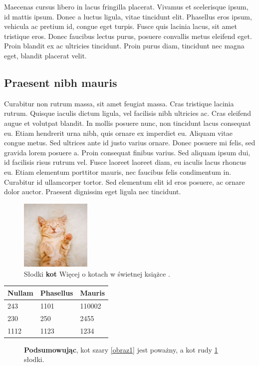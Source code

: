 \documentclass[a4paper, 12pt]{article}
\begin{document}
Maecenas cursus libero in lacus fringilla placerat. Vivamus et scelerisque ipsum, id mattis ipsum. Donec a luctus ligula, vitae tincidunt elit. Phasellus eros ipsum, vehicula ac pretium id, congue eget turpis. Fusce quis lacinia lacus, sit amet tristique eros. Donec faucibus lectus purus, posuere convallis metus eleifend eget. Proin blandit ex ac ultricies tincidunt. Proin purus diam, tincidunt nec magna eget, blandit placerat velit.

\subsection{Praesent nibh mauris}
Curabitur non rutrum massa, sit amet feugiat massa. Cras tristique lacinia rutrum. Quisque iaculis dictum ligula, vel facilisis nibh ultricies ac. Cras eleifend augue et volutpat blandit. In mollis posuere nunc, non tincidunt lacus consequat eu. Etiam hendrerit urna nibh, quis ornare ex imperdiet eu. Aliquam vitae congue metus. Sed ultrices ante id justo varius ornare. Donec posuere mi felis, sed gravida lorem posuere a. Proin consequat finibus varius. Sed aliquam ipsum dui, id facilisis risus rutrum vel. Fusce laoreet laoreet diam, eu iaculis lacus rhoncus eu. Etiam elementum porttitor mauris, nec faucibus felis condimentum in. Curabitur id ullamcorper tortor. Sed elementum elit \cite{2} id eros posuere, ac ornare dolor auctor. Praesent dignissim eget ligula nec tincidunt.

\begin{figure}[htp]
\centering
\includegraphics[width=0.3\textwidth]{image.png}
\caption{Słodki \textbf{kot} Więcej o kotach w świetnej książce \cite{1}.}
\label{obraz2}
\end{figure}

\centering
\begin{tabular}{|l|l|l|}
\hline
Nullam & Phasellus & Mauris  \\ \hline
243 & 1101 & 110002\\ \hline
230 & 250 & 2455\ \\ \hline
1112 & 1123 & 1234\ \\ \hline
\end{tabular}

\newline
\caption{Tabela z \textbf{nagłowkami} w postaci losowych słów z tekstu, a pod nimi przypadkowe liczby.}


\begin{figure}[htp]
\textbf{Podsumowując}, kot szary \ref{obraz1} jest poważny, a kot rudy \ref{obraz2} słodki.
\end{figure}
\newpage


\end{document}
